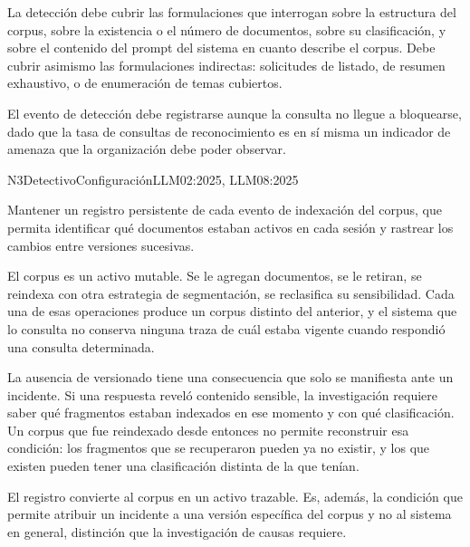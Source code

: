 La detección debe cubrir las formulaciones que interrogan sobre la estructura del corpus, sobre la existencia o el número de documentos, sobre su clasificación, y sobre el contenido del prompt del sistema en cuanto describe el corpus. Debe cubrir asimismo las formulaciones indirectas: solicitudes de listado, de resumen exhaustivo, o de enumeración de temas cubiertos.

El evento de detección debe registrarse aunque la consulta no llegue a bloquearse, dado que la tasa de consultas de reconocimiento es en sí misma un indicador de amenaza que la organización debe poder observar.


  {N3}{Detectivo}{Configuración}{LLM02:2025, LLM08:2025}

Mantener un registro persistente de cada evento de indexación del corpus, que permita identificar qué documentos estaban activos en cada sesión y rastrear los cambios entre versiones sucesivas.

El corpus es un activo mutable. Se le agregan documentos, se le retiran, se reindexa con otra estrategia de segmentación, se reclasifica su sensibilidad. Cada una de esas operaciones produce un corpus distinto del anterior, y el sistema que lo consulta no conserva ninguna traza de cuál estaba vigente cuando respondió una consulta determinada.

La ausencia de versionado tiene una consecuencia que solo se manifiesta ante un incidente. Si una respuesta reveló contenido sensible, la investigación requiere saber qué fragmentos estaban indexados en ese momento y con qué clasificación. Un corpus que fue reindexado desde entonces no permite reconstruir esa condición: los fragmentos que se recuperaron pueden ya no existir, y los que existen pueden tener una clasificación distinta de la que tenían.

El registro convierte al corpus en un activo trazable. Es, además, la condición que permite atribuir un incidente a una versión específica del corpus y no al sistema en general, distinción que la investigación de causas requiere.

